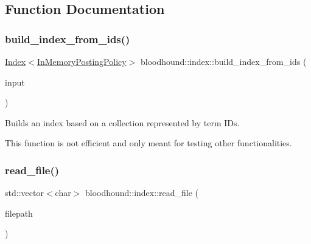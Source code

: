 \subsection{Function Documentation}
\mbox{\label{namespacebloodhound_1_1index_ac508959a4f3ab5ce65d62f1c294359e2}} 
\subsubsection{\texorpdfstring{build\+\_\+index\+\_\+from\+\_\+ids()}{build\_index\_from\_ids()}}
{\footnotesize\ttfamily \mbox{\hyperlink{classbloodhound_1_1index_1_1Index}{Index}}$<$\mbox{\hyperlink{classbloodhound_1_1index_1_1InMemoryPostingPolicy}{In\+Memory\+Posting\+Policy}}$>$ bloodhound\+::index\+::build\+\_\+index\+\_\+from\+\_\+ids (\begin{DoxyParamCaption}\item[{const std\+::vector$<$ std\+::vector$<$ \mbox{\hyperlink{structbloodhound_1_1TermWeight}{Term\+Weight}} $>$$>$ \&}]{input }\end{DoxyParamCaption})}

Builds an index based on a collection represented by term I\+Ds.

This function is not efficient and only meant for testing other functionalities. \mbox{\label{namespacebloodhound_1_1index_a4b6f89a17c10bf2927aff24df7081bb3}} 
\subsubsection{\texorpdfstring{read\+\_\+file()}{read\_file()}}
{\footnotesize\ttfamily std\+::vector$<$char$>$ bloodhound\+::index\+::read\+\_\+file (\begin{DoxyParamCaption}\item[{fs\+::path}]{filepath }\end{DoxyParamCaption})}

\mbox{\label{namespacebloodhound_1_1index_a306f62c55e8d06a9703f552f7cf312c5}} 
